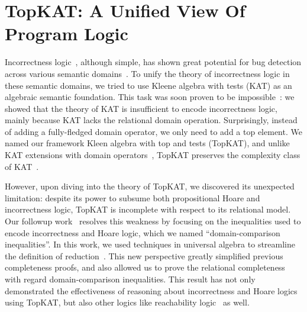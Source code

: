 \documentclass[11pt,a4paper,sans]{moderncv} %
\begin{document}
\section{TopKAT: A Unified View Of Program Logic}

Incorrectness logic~\cite{ohearn_IncorrectnessLogic_2020}, although simple, has shown great potential for bug detection across various semantic domains~\cite{raad_LocalReasoningPresence_2020,le_FindingRealBugs_2022, zhang_QuantitativeStrongestPost_2022b}.
To unify the theory of incorrectness logic in these semantic domains, we tried to use Kleene algebra with tests (KAT) as an algebraic semantic foundation. 
This task was soon proven to be impossible~\cite{zhang_IncorrectnessLogicKleene_2022}: we showed that the theory of KAT is insufficient to encode incorrectness logic, mainly because KAT lacks the relational domain operation.
Surprisingly, instead of adding a fully-fledged domain operator, we only need to add a top element.
We named our framework Kleen algebra with top and tests (TopKAT), and unlike KAT extensions with domain operators~\cite{desharnais_KleeneAlgebraDomain_2006,sedlar_ComplexityKleeneAlgebra_2023}, TopKAT preserves the complexity class of KAT~\cite{zhang_IncorrectnessLogicKleene_2022}.

However, upon diving into the theory of TopKAT, we discovered its unexpected limitation: despite its power to subsume both propositional Hoare and incorrectness logic, TopKAT is incomplete with respect to its relational model. 
Our followup work~\cite{zhang_DomainReasoningTopKAT_2024} resolves this weakness by focusing on the inequalities used to encode incorrectness and Hoare logic, which we named ``domain-comparison inequalities''. 
In this work, we used techniques in universal algebra to streamline the definition of reduction~\cite{pous_ToolsCompletenessKleene_2021,kozen_KleeneAlgebraTests_1997c}.
This new perspective greatly simplified previous completeness proofs, and also allowed us to prove the relational completeness with regard domain-comparison inequalities. 
This result has not only demonstrated the effectiveness of reasoning about incorrectness and Hoare logics using TopKAT, but also other logics like reachability logic~\cite{naus_ReachabilityLogicLowLevel_2022a} as well.
\end{document}
